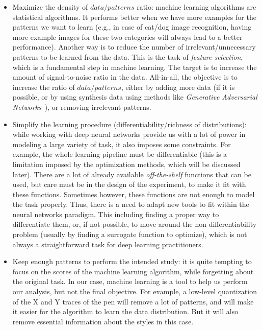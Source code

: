   \begin{itemize}
      \item Maximize the density of $data/patterns$ ratio: machine learning algorithms are statistical algorithms. It performs better when we have more examples for the patterns we want to learn (e.g., in case of cat/dog image recognition, having more example images for these two categories will always lead to a better performance).
      Another way is to reduce the number of irrelevant/unnecessary patterns to be learned from the data. This is the task of \textit{feature selection}, which is a fundamental step in machine learning. The target is to increase the amount of signal-to-noise ratio in the data.
      All-in-all, the objective is to increase the ratio of $data/patterns$, either by adding more data (if it is possible, or by using synthesis data using methods like \textit{Generative Adversarial Networks}~\citep{goodfellow2014generative}), or removing irrelevant patterns.
      \item Simplify the learning procedure (differentiability/richness of distributions): while working with deep neural networks provide us with a lot of power in modeling a large variety of task, it also imposes some constraints.
      For example, the whole learning pipeline must be differentiable (this is a limitation imposed by the optimization methods, which will be discussed later). There are a lot of already available \textit{off-the-shelf} functions that can be used, but care must be in the design of the experiment, to make it fit with these functions.
      Sometimes however, these functions are not enough to model the task properly. Thus, there is a need to adapt new tools to fit within the neural networks paradigm. This including finding a proper way to differentiate them, or, if not possible, to move around the non-differentiability problem (usually by finding a surrogate function to optimize), which is not always a straightforward task for deep learning practitioners.
      \item Keep enough patterns to perform the intended study: it is quite tempting to focus on the scores of the machine learning algorithm, while forgetting about the original task. In our case, machine learning is a tool to help us perform our analysis, but not the final objective. For example, a low-level quantization of the X and Y traces of the pen will remove a lot of patterns, and will make it easier for the algorithm to learn the data distribution. But it will also remove essential information about the styles in this case.
  \end{itemize}

